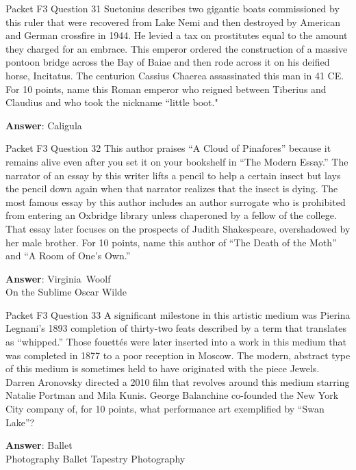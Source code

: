 \begin{frame}{Packet F3 Question 31}
Suetonius describes two gigantic boats commissioned by this ruler that were recovered from Lake Nemi and then destroyed by American and German crossfire in 1944. He levied a tax on prostitutes equal to the amount they charged for an embrace. This emperor ordered the construction of a massive pontoon bridge   across the Bay of Baiae and then rode     across it on his deified horse, Incitatus. The centurion Cassius Chaerea assassinated this man in   41 CE. For 10 points, name this Roman emperor who reigned between Tiberius and Claudius and who took the nickname “little boot."

\textbf{Answer}: Caligula\\
\end{frame}

\begin{frame}{Packet F3 Question 32}
This author praises ``A   Cloud of Pinafores'' because it remains alive even after you set it on your bookshelf in ``The Modern Essay.'' The narrator   of an essay by this   writer lifts a pencil to help a certain   insect but lays the pencil down again when that narrator realizes that the insect is dying. The most famous essay by this author includes an author surrogate who is prohibited from entering an Oxbridge library unless chaperoned by a fellow of the college. That   essay later focuses on the prospects of Judith Shakespeare, overshadowed by her   male brother. For 10 points, name this author of ``The Death of the Moth'' and ``A Room of One's Own.''

\textbf{Answer}: Virginia\ Woolf\\
 On the Sublime
 Oscar Wilde
\end{frame}

\begin{frame}{Packet F3 Question 33}
A significant milestone in this artistic medium was Pierina Legnani's 1893 completion of thirty-two feats described by a term that translates as ``whipped.'' Those fouettés were later inserted into a work in this medium that was completed in 1877 to a poor reception in Moscow. The modern, abstract type of this medium is sometimes   held to have originated with the piece Jewels. Darren Aronovsky directed a 2010 film that revolves around this medium starring Natalie Portman and Mila Kunis. George Balanchine co-founded the New York City company of, for 10 points, what performance art exemplified by ``Swan Lake''?      

\textbf{Answer}: Ballet\\
 Photography
 Ballet
 Tapestry
 Photography
\end{frame}

